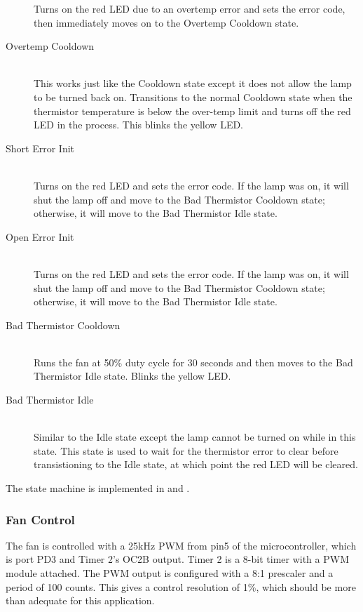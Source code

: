 \documentclass{article}
\begin{document}
\begin{description}
    Turns on the red LED due to an overtemp error and sets the error code, then immediately moves on
    to the Overtemp Cooldown state.
  \item[Overtemp Cooldown] \hfill \\
    This works just like the Cooldown state except it does not allow the lamp to be turned back on.
    Transitions to the normal Cooldown state when the thermistor temperature is below the over-temp
    limit and turns off the red LED in the process.  This blinks the yellow LED.
  \item[Short Error Init] \hfill \\
    Turns on the red LED and sets the error code.  If the lamp was on, it will shut the lamp off and
    move to the Bad Thermistor Cooldown state; otherwise, it will move to the Bad Thermistor Idle
    state.
  \item[Open Error Init] \hfill \\
    Turns on the red LED and sets the error code.  If the lamp was on, it will shut the lamp off and
    move to the Bad Thermistor Cooldown state; otherwise, it will move to the Bad Thermistor Idle
    state.
  \item[Bad Thermistor Cooldown] \hfill \\
    Runs the fan at 50\% duty cycle for 30 seconds and then moves to the Bad Thermistor Idle state.
    Blinks the yellow LED.
  \item[Bad Thermistor Idle] \hfill \\
    Similar to the Idle state except the lamp cannot be turned on while in this state.  This state
    is used to wait for the thermistor error to clear before transistioning to the Idle state, at
    which point the red LED will be cleared.
\end{description}

The state machine is implemented in  and .

\subsubsection{Fan Control} \label{sssec:FWAppFanControl}
The fan is controlled with a 25kHz PWM from pin5 of the microcontroller, which is port PD3 and Timer
2's OC2B output.  Timer 2 is a 8-bit timer with a PWM module attached.  The PWM output is configured
with a 8:1 prescaler and a period of 100 counts.  This gives a control resolution of 1\%, which
should be more than adequate for this application.
\end{document}
